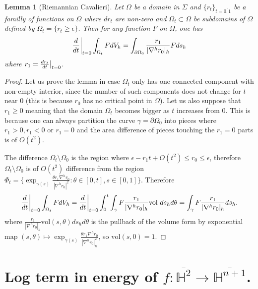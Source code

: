 \documentclass[11pt]{article}
\newtheorem{lemma}[theorem]{Lemma}
\newcommand\restr[2]{{%
\left.\kern-\nulldelimiterspace %
#1 %
\vphantom{\big|} %
\right|_{#2} %
}}
\begin{document}
\begin{lemma}[Riemannian Cavalieri]
\label{lem:var-domain}
Let \(\Omega\) be a domain in \(\Sigma\) and  \(\{r_t\}_{t=\overline{0,1}}\) be a familly of functions on \(\Omega\) where \(dr_t\) are non-zero and \(\Omega_t\subset \Omega\) be subdomains of \(\Omega\) defined by \(\Omega_t =
   \{r_t \geq \epsilon\}\). Then for any function \(F\) on \(\Omega\), one has
\[
   \restr{\frac{d}{dt}}{t=0}\int_{\Omega_t}F dV_h = \int_{\partial\Omega_0}
   \frac{r_1}{|\nabla^h r_0|_h}F ds_h
   \]
where \(r_1 = \restr{\frac{dr_t}{dt}}{t=0}\).
\end{lemma}


\begin{proof}
Let us prove the lemma in case \(\Omega_t\) only has one connected component with
non-empty interior, since
the number of such components does not change for \(t\) near 0 (this is because
\(r_0\) has no critical point in \(\Omega\)). Let
us also suppose that \(r_1 \geq 0\) meaning that the domain \(\Omega_t\)
becomes bigger as \(t\) increases from \(0\). This is because one can always
partition the curve \(\gamma = \partial\Omega_0\) into pieces where \(r_1>0, r_1 <0\) or \(r_1=0\)
and the area difference of pieces touching the \(r_1=0\) parts is of \(O(t^2)\). 

The difference \(\Omega_t\setminus \Omega_0\) is the region where \(\epsilon -r_1 t+
   O(t^2)\leq r_0 \leq \epsilon\), therefore \(\Omega_t\setminus \Omega_0\) is of \(O(t^2)\) difference from the region \(\Phi_t = \{ \exp_{\gamma(s)}\frac{\theta r_1\nabla^h
   r_0}{|\nabla^h r_0|^2}:\theta \in[0,t], s\in[0,1] \}\). Therefore
\[
   \restr{\frac{d}{dt}}{t=0}\int_{\Omega_t}F dV_h
   =\restr{\frac{d}{dt}}{t=0} \int_0^t \int_{\gamma} F \frac{r_1}{|\nabla^h r_0|_h} \text{vol }ds_h d\theta = \int_{\gamma} F\frac{r_1}{|\nabla^h r_0|_h} ds_h .
   \]
where \(\frac{r_1}{|\nabla^h r_0|_h}\text{vol}(s,\theta) ds_h d\theta\) is the
pullback of the volume form by exponential map
\((s,\theta)\mapsto \exp_{\gamma(s)} \frac{\theta r_1\nabla^h r_0}{|\nabla^h r_0|_h^2}\), so \(\text{vol}(s,0) = 1\).
\end{proof}




\section{Log term in energy of \(f: \overline{\mathbb{H}^2} \longrightarrow \overline{\mathbb{H}^{n+1}}\).}
\label{sec:org6b8c471}
\end{document}
